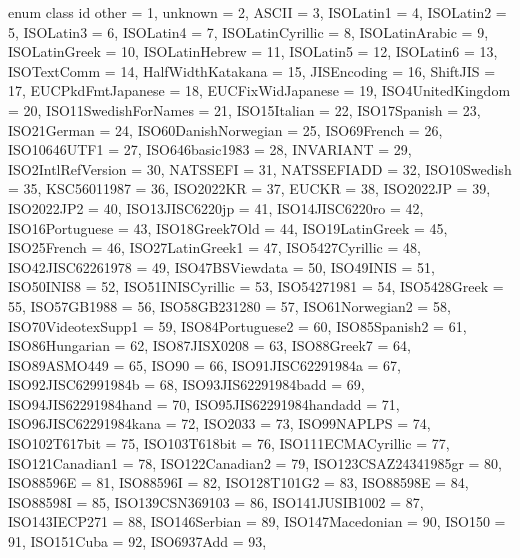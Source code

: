 \documentclass{wg21}
\begin{document}
\begin{addedblock}
\begin{codeblock}
    enum class id {
        other = 1,
        unknown = 2,
        ASCII = 3,
        ISOLatin1 = 4,
        ISOLatin2 = 5,
        ISOLatin3 = 6,
        ISOLatin4 = 7,
        ISOLatinCyrillic = 8,
        ISOLatinArabic = 9,
        ISOLatinGreek = 10,
        ISOLatinHebrew = 11,
        ISOLatin5 = 12,
        ISOLatin6 = 13,
        ISOTextComm = 14,
        HalfWidthKatakana = 15,
        JISEncoding = 16,
        ShiftJIS = 17,
        EUCPkdFmtJapanese = 18,
        EUCFixWidJapanese = 19,
        ISO4UnitedKingdom = 20,
        ISO11SwedishForNames = 21,
        ISO15Italian = 22,
        ISO17Spanish = 23,
        ISO21German = 24,
        ISO60DanishNorwegian = 25,
        ISO69French = 26,
        ISO10646UTF1 = 27,
        ISO646basic1983 = 28,
        INVARIANT = 29,
        ISO2IntlRefVersion = 30,
        NATSSEFI = 31,
        NATSSEFIADD = 32,
        ISO10Swedish = 35,
        KSC56011987 = 36,
        ISO2022KR = 37,
        EUCKR = 38,
        ISO2022JP = 39,
        ISO2022JP2 = 40,
        ISO13JISC6220jp = 41,
        ISO14JISC6220ro = 42,
        ISO16Portuguese = 43,
        ISO18Greek7Old = 44,
        ISO19LatinGreek = 45,
        ISO25French = 46,
        ISO27LatinGreek1 = 47,
        ISO5427Cyrillic = 48,
        ISO42JISC62261978 = 49,
        ISO47BSViewdata = 50,
        ISO49INIS = 51,
        ISO50INIS8 = 52,
        ISO51INISCyrillic = 53,
        ISO54271981 = 54,
        ISO5428Greek = 55,
        ISO57GB1988 = 56,
        ISO58GB231280 = 57,
        ISO61Norwegian2 = 58,
        ISO70VideotexSupp1 = 59,
        ISO84Portuguese2 = 60,
        ISO85Spanish2 = 61,
        ISO86Hungarian = 62,
        ISO87JISX0208 = 63,
        ISO88Greek7 = 64,
        ISO89ASMO449 = 65,
        ISO90 = 66,
        ISO91JISC62291984a = 67,
        ISO92JISC62991984b = 68,
        ISO93JIS62291984badd = 69,
        ISO94JIS62291984hand = 70,
        ISO95JIS62291984handadd = 71,
        ISO96JISC62291984kana = 72,
        ISO2033 = 73,
        ISO99NAPLPS = 74,
        ISO102T617bit = 75,
        ISO103T618bit = 76,
        ISO111ECMACyrillic = 77,
        ISO121Canadian1 = 78,
        ISO122Canadian2 = 79,
        ISO123CSAZ24341985gr = 80,
        ISO88596E = 81,
        ISO88596I = 82,
        ISO128T101G2 = 83,
        ISO88598E = 84,
        ISO88598I = 85,
        ISO139CSN369103 = 86,
        ISO141JUSIB1002 = 87,
        ISO143IECP271 = 88,
        ISO146Serbian = 89,
        ISO147Macedonian = 90,
        ISO150 = 91,
        ISO151Cuba = 92,
        ISO6937Add = 93,
}
\end{codeblock}
\end{addedblock}
\end{document}

